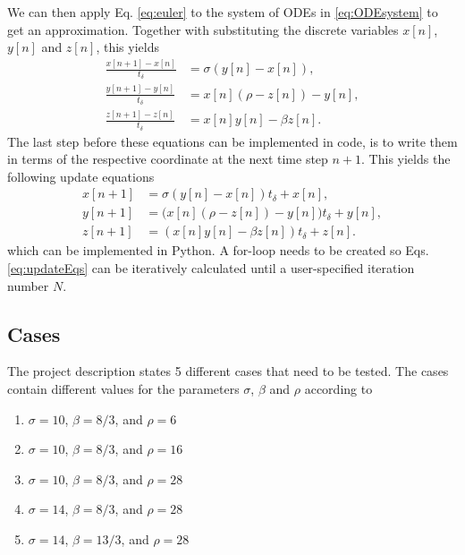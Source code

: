\documentclass{article}
\def\td{t_\delta}
\begin{document}
We can then apply Eq. \eqref{eq:euler} to the system of ODEs in \eqref{eq:ODEsystem} to get an approximation. Together with substituting the discrete variables $x[n]$, $y[n]$ and $z[n]$, this yields
\begin{subequations}
\begin{align}
    \frac{x[n+1] - x[n]}{\td} &= \sigma(y[n]-x[n]),\\
        \frac{y[n+1] - y[n]}{\td} &= x[n](\rho - z[n]) - y[n],\\
        \frac{z[n+1] - z[n]}{\td} &= x[n]y[n] - \beta z[n].
\end{align}
\end{subequations}
The last step before these equations can be implemented in code, is to write them in terms of the respective coordinate at the next time step $n+1$. This yields the following update equations
\begin{subequations}\label{eq:updateEqs}
    \begin{align}
        x[n+1] &= \sigma(y[n]-x[n])\td + x[n],\\
        y[n+1]&= \Big( x[n](\rho - z[n]) - y[n]\Big) \td + y[n],\\
        z[n+1] &= (x[n]y[n] - \beta z[n])\td + z[n].
    \end{align}
\end{subequations}
which can be implemented in Python. A for-loop needs to be created so Eqs. \eqref{eq:updateEqs} can be iteratively calculated until a user-specified iteration number $N$.

\subsection{Cases}\label{sec:cases}
The project description states 5 different cases that need to be tested. The cases contain different values for the parameters $\sigma$, $\beta$ and $\rho$ according to

\begin{enumerate}
    \item $\sigma = 10$, $\beta = 8/3$, and $\rho = 6$
    \item $\sigma = 10$, $\beta = 8/3$, and $\rho = 16$
    \item $\sigma = 10$, $\beta = 8/3$, and $\rho = 28$
    \item $\sigma = 14$, $\beta = 8/3$, and $\rho = 28$
    \item $\sigma = 14$, $\beta = 13/3$, and $\rho = 28$
\end{enumerate}
\end{document}
